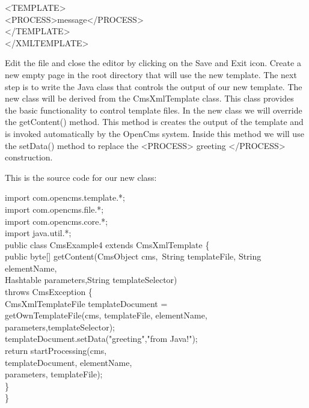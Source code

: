 \begin{xml}
<TEMPLATE>\\
<PROCESS>message</PROCESS>\\
</TEMPLATE>\\
</XMLTEMPLATE>\\
\end{xml}

Edit the file and close the editor by clicking on  the {\name Save and Exit}
icon. Create a new empty page in the root directory that will use the
new template.
The next step is to write the Java class that controls the output of
our new template. The new class will be derived from the {\class CmsXmlTemplate}
class. This class provides the basic functionality to control template
files. In the new class we will override the {\meth getContent()} method. This
method is creates the output of the template and is invoked
automatically by the OpenCms system. Inside this method we will use the
{\meth setData()} method to replace the {\tag <PROCESS>} greeting {\tag</PROCESS>}
construction.

This is the source code for our new class:

\begin{java}
import com.opencms.template.*;\\
import com.opencms.file.*;\\
import com.opencms.core.*;\\

import java.util.*;\\

public class CmsExample4 extends CmsXmlTemplate \{\\
public byte[] getContent(CmsObject cms,\
\jtabd        String templateFile, String elementName,\\
\jtabd        Hashtable parameters,String templateSelector)\\
\jtabd        throws CmsException \{\\
\jtabd        CmsXmlTemplateFile templateDocument =\\
\jtabd        getOwnTemplateFile(cms, templateFile, elementName,\\
\jtabd                           parameters,templateSelector);\\


\jtabc        templateDocument.setData("greeting","from Java!");\\
\jtabc        return startProcessing(cms,\\
\jtabd                               templateDocument, elementName,\\
\jtabd                               parameters, templateFile);\\
\jtabb    \}\\
\}\\
\end{java}

